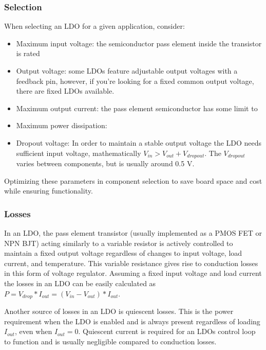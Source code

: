 \documentclass[main.tex]{subfiles}
\begin{document}
\subsubsection{Selection}
When selecting an LDO for a given application, consider: 
\begin{itemize}
    \item Maximum input voltage: the semiconductor pass element inside the transistor is rated 
    \item Output voltage: some LDOs feature adjustable output voltages with a feedback pin, however, if you're looking for a fixed common output voltage, there are fixed LDOs available.
    \item Maximum output current: the pass element semiconductor has some limit to 
    \item Maximum power dissipation: 
    \item Dropout voltage: In order to maintain a stable output voltage the LDO needs sufficient input voltage, mathematically $V_{in} > V_{out} + V_{dropout}$. The $V_{dropout}$ varies between components, but is usually around 0.5 V. 
\end{itemize}
Optimizing these parameters in component selection to save board space and cost while ensuring functionality.

\subsubsection{Losses}
In an LDO, the pass element transistor (usually implemented as a PMOS FET or NPN BJT) acting similarly to a variable resistor is actively controlled to maintain a fixed output voltage regardless of changes to input voltage, load current, and temperature. This variable resistance gives rise to conduction losses in this form of voltage regulator. Assuming a fixed input voltage and load current the losses in an LDO can be easily calculated as $P = V_{drop} * I_{out} = (V_{in} - V_{out}) * I_{out}$.

Another source of losses in an LDO is quiescent losses. This is the power requirement when the LDO is enabled and is always present regardless of loading $I_{out}$, even when $I_{out} = 0$. Quiescent current is required for an LDOs control loop to function and is usually negligible compared to conduction losses.  
\end{document}
